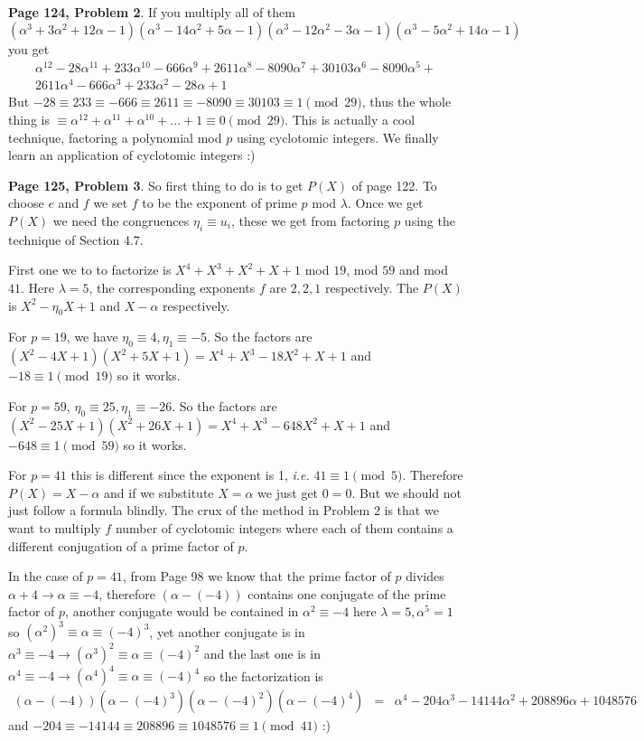 \documentclass[aps,preprint,preprintnumbers,nofootinbib,showpacs,prd]{revtex4-1}
\newcommand{\ie}{{\it i.e.} }
\newcommand{\nbea}{\begin{eqnarray*}}
\newcommand{\neea}{\end{eqnarray*}}
\begin{document}
{\bf Page 124, Problem 2}. If you multiply all of them $(\alpha^3 + 3\alpha^2 + 12\alpha - 1)(\alpha^3 - 14\alpha^2 + 5\alpha - 1)(\alpha^3-12\alpha^2-3\alpha-1)(\alpha^3 - 5\alpha^2 + 14\alpha - 1)$ you get
%
\nbea
\alpha^{12}-28\alpha^{11}+233\alpha^{10}-666\alpha^9+2611\alpha^8-8090\alpha^7+30103\alpha^6-8090\alpha^5+\\
2611\alpha^4-666\alpha^3+233\alpha^2-28\alpha+1
\neea
%
But $-28 \equiv 233 \equiv -666 \equiv 2611 \equiv -8090 \equiv 30103 \equiv 1 \pmod{29}$, thus the whole thing is $\equiv \alpha^{12} + \alpha^{11} + \alpha^{10} + \dots + 1 \equiv 0 \pmod{29}$. This is actually a cool technique, factoring a polynomial mod $p$ using cyclotomic integers. We finally learn an application of cyclotomic integers :)

{\bf Page 125, Problem 3}. So first thing to do is to get $P(X)$ of page 122. To choose $e$ and $f$ we set $f$ to be the exponent of prime $p$ mod $\lambda$. Once we get $P(X)$ we need the congruences $\eta_i \equiv u_i$, these we get from factoring $p$ using the technique of Section 4.7.

First one we to to factorize is $X^4 + X^3 + X^2 + X + 1$ mod $19$, mod $59$ and mod $41$. Here $\lambda = 5$, the corresponding exponents $f$ are $2, 2, 1$ respectively. The $P(X)$ is $X^2 - \eta_0X + 1$ and $X - \alpha$ respectively.

For $p = 19$, we have $\eta_0 \equiv 4, \eta_1 \equiv -5$. So the factors are $(X^2 - 4X + 1)(X^2 +5X + 1) = X^4+X^3-18X^2+X+1$ and $-18 \equiv 1 \pmod{19}$ so it works.

For $p = 59$, $\eta_0 \equiv 25, \eta_1 \equiv -26$. So the factors are $(X^2 - 25X + 1)(X^2 +26X + 1) = X^4+X^3-648X^2+X+1$ and $-648 \equiv 1 \pmod{59}$ so it works.

For $p = 41$ this is different since the exponent is 1, \ie $41 \equiv 1 \pmod{5}$. Therefore $P(X) = X - \alpha$ and if we substitute $X = \alpha$ we just get $0 = 0$. But we should not just follow a formula blindly. The crux of the method in Problem 2 is that we want to multiply $f$ number of cyclotomic integers where each of them contains a different conjugation of a prime factor of $p$.

In the case of $p = 41$, from Page 98 we know that the prime factor of $p$ divides $\alpha + 4 \to \alpha \equiv -4$, therefore $(\alpha - (-4))$ contains one conjugate of the prime factor of $p$, another conjugate would be contained in $\alpha^2 \equiv -4$ here $\lambda = 5, \alpha^5 = 1$ so $(\alpha^2)^3 \equiv \alpha \equiv (-4)^3$, yet another conjugate is in $\alpha^3 \equiv -4 \to (\alpha^3)^2 \equiv \alpha \equiv (-4)^2$ and the last one is in $\alpha^4 \equiv -4 \to (\alpha^4)^4 \equiv \alpha \equiv (-4)^4$ so the factorization is
%
\nbea
(\alpha -(-4))(\alpha -(-4)^3)(\alpha -(-4)^2)(\alpha -(-4)^4) & = & \alpha^4-204\alpha^3-14144\alpha^2+208896\alpha+1048576
\neea
%
and $-204 \equiv -14144 \equiv 208896 \equiv 1048576 \equiv 1 \pmod{41}$ :)
\end{document}
